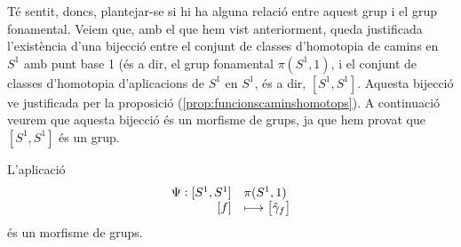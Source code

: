 \documentclass[../main.tex]{subfiles}
\begin{document}
Té sentit, doncs, plantejar-se si hi ha alguna relació entre aquest grup i el grup fonamental. Veiem que, amb el que hem vist anteriorment, queda justificada l'existència d'una bijecció entre el conjunt de classes d'homotopia de camins en $S^1$ amb punt base 1 (és a dir, el grup fonamental $\pi(S^1,1)$, i el conjunt de classes d'homotopia d'aplicacions de $S^1$ en $S^1$, és a dir, $[S^1,S^1]$. Aquesta bijecció ve justificada per la proposició (\ref{prop:funcionscaminshomotops}). A continuació veurem que aquesta bijecció és un morfisme de grups, ja que hem provat que $[S^1,S^1]$ és un grup.

\begin{prop}
\label{prop:morfismegrupsentrefonamentalihomotpia} L'aplicació
\begin{equation}
    \notag
    \begin{array}{rl}
        \Psi:[S^1,S^1] & \pi(S^1,1) \\
        \left[f\right] & \longmapsto \left[\hat{\gamma}_f\right]
    \end{array}
\end{equation}
és un morfisme de grups.
\end{prop}
\end{document}
